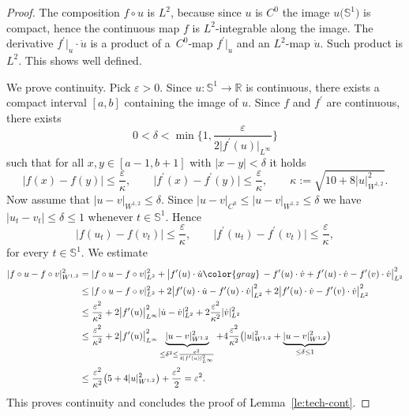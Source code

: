 \documentclass[pdftex]{sigma}
\numberwithin{equation}{section}
\newcommand{\R}{{\mathbb{R}}}
\renewcommand{\SS}{{\mathbb{S}}}
\newcommand{\eps}{{\varepsilon}}
\def\abs#1{\mathopen|#1\mathclose|}
\newcommand{\1}{{{\mathchoice {\rm 1\mskip-4mu l} {\rm 1\mskip-4mu l}
{\rm 1\mskip-4.5mu l} {\rm 1\mskip-5mu l}}}}
\begin{document}
\begin{proof}
The composition $f\circ u$ is $L^2$, because
since $u$ is $C^0$ the image $u\bigl(\SS^1\bigr)$ is compact,
hence the continuous map $f$ is $L^2$-integrable along the image.
The derivative $f^\prime|_u\cdot \dot u$ is a product of a~$C^0$-map
$f^\prime|_u$ and an $L^2$-map $\dot u$.
Such product is $L^2$. This shows well defined.

We prove continuity. Pick $\eps>0$.
Since $u\colon\SS^1\to\R$ is continuous, there exists a compact
interval $[a,b]$ containing the image of $u$.
Since $f$ and $f^\prime$ are continuous, there exists
\[
 0<\delta<\min\biggl\{1,\frac{\eps}{2\abs{f^\prime(u)}_{L^\infty}}\biggr\}
\]
such that for all $x,y\in [a-1,b+1]$ with $\abs{x-y}<\delta$ it holds
\[
 \abs{f(x)-f(y)}\le \frac{\eps}{\kappa}
 ,\qquad
 \bigl|f^\prime(x)-f^\prime(y)\bigr|\le \frac{\eps}{\kappa}
 ,\qquad
 \kappa:=\sqrt{10+8\abs{u}_{W^{1,2}}^2} .
\]
Now assume that $\abs{u-v}_{W^{1,2}}\le\delta$.
Since $\abs{u-v}_{C^0}\le \abs{u-v}_{W^{1,2}}\le\delta$
we have $\abs{u_t-v_t}\le\delta\le 1$ whenever $t\in\SS^1$.
Hence
\[
 \abs{f(u_t)-f(v_t)}\le \frac{\eps}{\kappa}
 ,\qquad
 \bigl|f^\prime(u_t)-f^\prime(v_t)\bigr|\le \frac{\eps}{\kappa} ,
\]
for every $t\in\SS^1$.
We estimate
\begin{equation*}
\begin{split}
 \abs{f\circ u-f\circ v}_{W^{1,2}}^2
 &=\abs{f\circ u-f\circ v}_{L^2}^2
 +\bigl|f^\prime(u)\cdot \dot u
{\color{gray}\,
-f^\prime(u)\cdot \dot v
+f^\prime(u)\cdot \dot v
}
 -f^\prime(v)\cdot \dot v\bigr|_{L^2}^2
\\
 &\le \abs{f\circ u-f\circ v}_{L^2}^2
 +2\bigl|f^\prime(u)\cdot \dot u-f^\prime(u)\cdot \dot v\bigr|_{L^2}^2
 +2\bigl|f^\prime(u)\cdot \dot v-f^\prime(v)\cdot \dot v\bigr|_{L^2}^2
\\
 &\le \frac{\eps^2}{\kappa^2}
 +2\bigl|f^\prime(u)\bigr|_{L^\infty}^2\abs{\dot u-\dot v}_{L^2}^2
 +2\frac{\eps^2}{\kappa^2}\abs{\dot v}_{L^2}^2
\\
 &\le \frac{\eps^2}{\kappa^2}
 +2\bigl|f^\prime(u)\bigr|_{L^\infty}^2
 \underbrace{\abs{u-v}_{W^{1,2}}^2}
 _{\le\delta^2\le\frac{\eps^2}{4\abs{f^\prime(u)}_{L^\infty}^2}}
 +4\frac{\eps^2}{\kappa^2}
 \bigl(
 \abs{u}_{W^{1,2}}^2+\underbrace{\abs{u-v}_{W^{1,2}}^2}_{\le\delta\le 1}
 \bigr)
\\
 &\le \frac{\eps^2}{\kappa^2}\bigl(5+4\abs{u}_{W^{1,2}}^2\bigr)
 +\frac{\eps^2}{2}=\eps^2 .
\end{split}
\end{equation*}
This proves continuity and concludes the proof of
Lemma~\ref{le:tech-cont}.
\end{proof}
\end{document}

